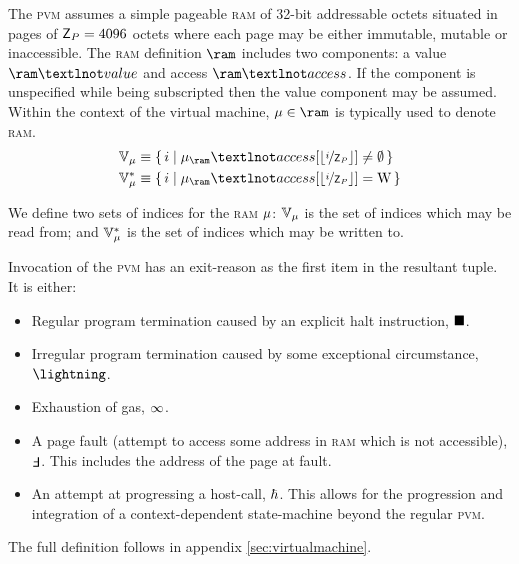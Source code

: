 The \textsc{pvm} assumes a simple pageable \textsc{ram} of 32-bit addressable octets situated in pages of $\mathsf{Z}_P = 4096$ octets where each page may be either immutable, mutable or inaccessible. The \textsc{ram} definition $\ram$ includes two components: a value $\ram¬value$ and access $\ram¬access$. If the component is unspecified while being subscripted then the value component may be assumed. Within the context of the virtual machine, $\memory \in \ram$ is typically used to denote \textsc{ram}.
\begin{align}
  \readable{\memory} &\equiv \set{\build{i}{\memory_\ram¬access\subb{\floor{\nicefrac{i}{\Cpvmpagesize}}} \ne \none}} \\
  \writable{\memory} &\equiv \set{\build{i}{\memory_\ram¬access\subb{\floor{\nicefrac{i}{\Cpvmpagesize}}} = \text{W} }}
\end{align}

We define two sets of indices for the \textsc{ram} $\mu$: $\mathbb{V}_{\mu}$ is the set of indices which may be read from; and $\mathbb{V}_{\mu}^*$ is the set of indices which may be written to.

Invocation of the \textsc{pvm} has an exit-reason as the first item in the resultant tuple. It is either:
\begin{itemize}
  \item Regular program termination caused by an explicit halt instruction, $\blacksquare$.
  \item Irregular program termination caused by some exceptional circumstance, $\panic$.
  \item Exhaustion of gas, $\infty$.
  \item A page fault (attempt to access some address in \textsc{ram} which is not accessible), $\fault$. This includes the address of the page at fault.
  \item An attempt at progressing a host-call, $\hbar$. This allows for the progression and integration of a context-dependent state-machine beyond the regular \textsc{pvm}.
\end{itemize}

The full definition follows in appendix \ref{sec:virtualmachine}.

















